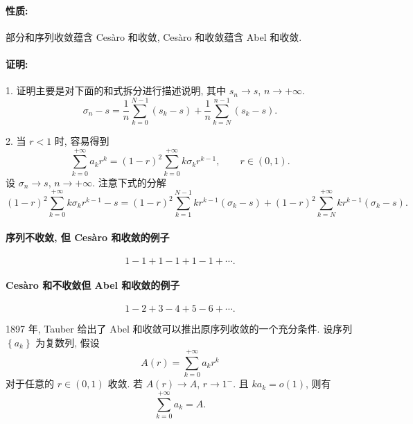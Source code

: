 \paragraph{性质: }

部分和序列收敛蕴含 Ces\`{a}ro 和收敛, Ces\`{a}ro 和收敛蕴含 Abel 和收敛.

\paragraph{证明:}

1. 证明主要是对下面的和式拆分进行描述说明, 其中 $s_{n}\to s$, $n\to+\infty$.
\[
\sigma_{n}-s=\frac{1}{n}\sum_{k=0}^{N-1}(s_{k}-s)+\frac{1}{n}\sum_{k=N}^{n-1}(s_{k}-s).
\]

2. 当 $r<1$ 时, 容易得到
\[
\sum_{k=0}^{+\infty}a_{k}r^{k}=(1-r)^{2}\sum_{k=0}^{+\infty}k\sigma_{k}r^{k-1},\qquad r\in(0,1).
\]
设 $\sigma_{n}\to s$, $n\to+\infty$. 注意下式的分解
\[
(1-r)^{2}\sum_{k=0}^{+\infty}k\sigma_{k}r^{k-1}-s=(1-r)^{2}\sum_{k=1}^{N-1}kr^{k-1}\left(\sigma_{k}-s\right)+(1-r)^{2}\sum_{k=N}^{+\infty}kr^{k-1}\left(\sigma_{k}-s\right).
\]


\paragraph{序列不收敛, 但 Ces\`{a}ro 和收敛的例子}

\[
1-1+1-1+1-1+\cdots.
\]

\paragraph{Ces\`{a}ro 和不收敛但 Abel 和收敛的例子}

\[
1-2+3-4+5-6+\cdots.
\]

1897 年, Tauber 给出了 Abel 和收敛可以推出原序列收敛的一个充分条件. 
设序列 $\left\{ a_{k}\right\}$ 为复数列, 假设
\[
A(r)=\sum_{k=0}^{+\infty}a_{k}r^{k}
\]
对于任意的 $r\in(0,1)$ 收敛. 若 $A(r)\to A$, $r\to1^{-}$. 且 $ka_{k}=o(1)$,
则有
\[
\sum_{k=0}^{+\infty}a_{k}=A.
\]
\et

